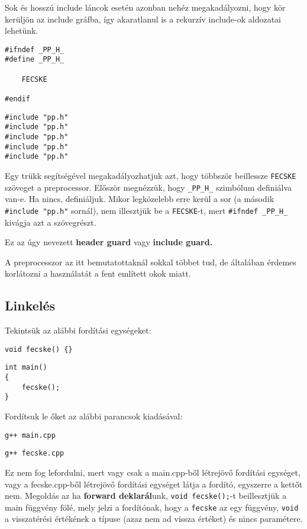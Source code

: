 \documentclass[../cpp_book/cpp_book.tex]{subfiles}
\begin{document}
	Sok és hosszú include láncok esetén azonban nehéz megakadályozni, hogy kör kerüljön az include gráfba, így akaratlanul is a rekurzív include-ok aldozatai lehetünk.
	\bigskip
	
	\begin{lstlisting}
#ifndef _PP_H_
#define _PP_H_

	FECSKE

#endif
	\end{lstlisting}
	
	\begin{lstlisting}
#include "pp.h"
#include "pp.h"
#include "pp.h"
#include "pp.h"
#include "pp.h"
	\end{lstlisting}
	
	Egy trükk segítségével megakadályozhatjuk azt, hogy többször beillessze \texttt{FECSKE} szöveget a preprocessor. Először megnézzük, hogy \texttt{\_PP\_H\_} szimbólum definiálva van-e. Ha nincs, definiáljuk. Mikor legközelebb erre kerül a sor (a második \texttt{\#include "pp.h"} sornál), nem illesztjük be a \texttt{FECSKE}-t, mert \texttt{\#ifndef \_PP\_H\_} kivágja azt a szövegrészt.
	
	Ez az úgy nevezett \textbf{header guard} vagy \textbf{include guard.}
	
	\medskip
	A preprocesszor az itt bemutatottaknál sokkal többet tud, de általában érdemes korlátozni a használatát a fent említett okok miatt.
	
	\subsection{Linkelés}
	Tekintsük az alábbi fordítási egységeket:
	
	\smallskip
	\begin{lstlisting}
void fecske() {}
	\end{lstlisting}
	
	\smallskip
	\begin{lstlisting}
int main()
{
	fecske();
}
	\end{lstlisting}
	Fordítsuk le őket az alábbi parancsok kiadásával:
	
	{\centering\texttt{g++ main.cpp}\par}
	
	{\centering\texttt{g++ fecske.cpp}\par}
	
	Ez nem fog lefordulni, mert vagy csak a main.cpp-ből létrejövő fordítási egységet, vagy a fecske.cpp-ből létrejövő fordítási egységet látja a fordító, egyszerre a kettőt nem. Megoldás az ha \textbf{forward deklarál}unk, \texttt{void fecske();}-t beillesztjük a main függvény fölé, mely jelzi a fordítónak, hogy a \texttt{fecske} az egy függvény, \texttt{void} a visszatérési értékének a típuse (azaz nem ad vissza értéket) és nincs paramétere. 
	
\end{document}

